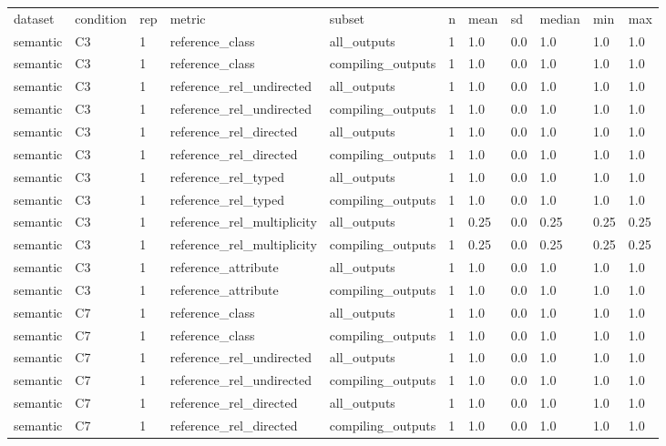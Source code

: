 \begin{tabular}{lllllllllll}
dataset & condition & rep & metric & subset & n & mean & sd & median & min & max \\
semantic & C3 & 1 & reference\_class & all\_outputs & 1 & 1.0 & 0.0 & 1.0 & 1.0 & 1.0 \\
semantic & C3 & 1 & reference\_class & compiling\_outputs & 1 & 1.0 & 0.0 & 1.0 & 1.0 & 1.0 \\
semantic & C3 & 1 & reference\_rel\_undirected & all\_outputs & 1 & 1.0 & 0.0 & 1.0 & 1.0 & 1.0 \\
semantic & C3 & 1 & reference\_rel\_undirected & compiling\_outputs & 1 & 1.0 & 0.0 & 1.0 & 1.0 & 1.0 \\
semantic & C3 & 1 & reference\_rel\_directed & all\_outputs & 1 & 1.0 & 0.0 & 1.0 & 1.0 & 1.0 \\
semantic & C3 & 1 & reference\_rel\_directed & compiling\_outputs & 1 & 1.0 & 0.0 & 1.0 & 1.0 & 1.0 \\
semantic & C3 & 1 & reference\_rel\_typed & all\_outputs & 1 & 1.0 & 0.0 & 1.0 & 1.0 & 1.0 \\
semantic & C3 & 1 & reference\_rel\_typed & compiling\_outputs & 1 & 1.0 & 0.0 & 1.0 & 1.0 & 1.0 \\
semantic & C3 & 1 & reference\_rel\_multiplicity & all\_outputs & 1 & 0.25 & 0.0 & 0.25 & 0.25 & 0.25 \\
semantic & C3 & 1 & reference\_rel\_multiplicity & compiling\_outputs & 1 & 0.25 & 0.0 & 0.25 & 0.25 & 0.25 \\
semantic & C3 & 1 & reference\_attribute & all\_outputs & 1 & 1.0 & 0.0 & 1.0 & 1.0 & 1.0 \\
semantic & C3 & 1 & reference\_attribute & compiling\_outputs & 1 & 1.0 & 0.0 & 1.0 & 1.0 & 1.0 \\
semantic & C7 & 1 & reference\_class & all\_outputs & 1 & 1.0 & 0.0 & 1.0 & 1.0 & 1.0 \\
semantic & C7 & 1 & reference\_class & compiling\_outputs & 1 & 1.0 & 0.0 & 1.0 & 1.0 & 1.0 \\
semantic & C7 & 1 & reference\_rel\_undirected & all\_outputs & 1 & 1.0 & 0.0 & 1.0 & 1.0 & 1.0 \\
semantic & C7 & 1 & reference\_rel\_undirected & compiling\_outputs & 1 & 1.0 & 0.0 & 1.0 & 1.0 & 1.0 \\
semantic & C7 & 1 & reference\_rel\_directed & all\_outputs & 1 & 1.0 & 0.0 & 1.0 & 1.0 & 1.0 \\
semantic & C7 & 1 & reference\_rel\_directed & compiling\_outputs & 1 & 1.0 & 0.0 & 1.0 & 1.0 & 1.0 \\

\end{tabular}
